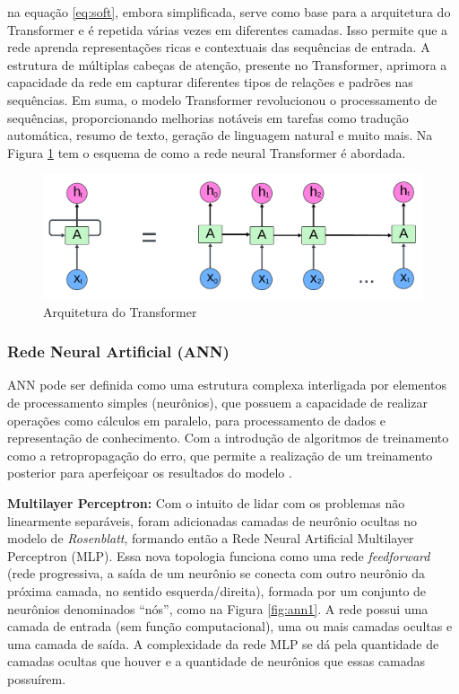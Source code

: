 \noindent na equação \eqref{eq:soft}, embora simplificada, serve como base para a arquitetura do Transformer e é repetida várias vezes em diferentes camadas. Isso permite que a rede aprenda representações ricas e contextuais das sequências de entrada. A estrutura de múltiplas cabeças de atenção, presente no Transformer, aprimora a capacidade da rede em capturar diferentes tipos de relações e padrões nas sequências. Em suma, o modelo Transformer revolucionou o processamento de sequências, proporcionando melhorias notáveis em tarefas como tradução automática, resumo de texto, geração de linguagem natural e muito mais. Na Figura \ref{fig:transformer} tem o esquema de como a rede neural Transformer é abordada.

\begin{figure}[H]
	\centering
	\caption{Arquitetura do Transformer}
	\label{fig:transformer}
	\includegraphics[width=1\linewidth]{Apendices/Figuras/modelagem-24h/Transformer}
	
\end{figure}

\subsubsection{Rede Neural Artificial (ANN)}

ANN pode ser definida como uma estrutura complexa interligada por elementos de processamento simples (neurônios), que possuem a capacidade de realizar operações como cálculos em paralelo, para processamento de dados e representação de conhecimento. Com a introdução de algoritmos de treinamento como a retropropagação do erro, que permite a realização de um treinamento posterior para aperfeiçoar os resultados do modelo \cite{Grubler2018}.

\noindent\textbf{Multilayer Perceptron:}
Com o intuito de lidar com os problemas não linearmente separáveis, foram adicionadas camadas de neurônio ocultas no modelo de \textit{Rosenblatt}, formando então a Rede Neural Artificial Multilayer Perceptron (MLP).
Essa nova topologia funciona como uma rede \textit{feedforward} (rede progressiva, a saída de um neurônio se conecta com outro neurônio da próxima camada, no sentido esquerda/direita), formada por um conjunto de neurônios denominados ``nós'', como  na Figura \ref{fig:ann1}. A rede possui uma camada de entrada (sem função computacional), uma ou mais camadas ocultas e uma camada de saída. A complexidade da rede MLP se dá pela quantidade de camadas ocultas que houver e a quantidade de neurônios que essas camadas possuírem.


